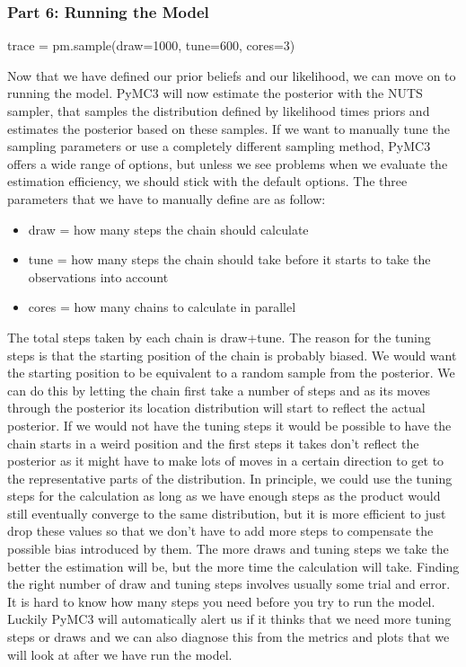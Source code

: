 \documentclass[12pt,a4paper,leqno]{report}
\theoremstyle{plain}
\theoremstyle{definition}
\theoremstyle{remark}
\begin{document}
\subsubsection*{Part 6: Running the Model}

\bigskip
\begin{pyverbatim}[][fontsize=\footnotesize]
    trace = pm.sample(draw=1000, tune=600, cores=3)
\end{pyverbatim}
\smallskip

Now that we have defined our prior beliefs and our likelihood, we can move on to running the
model. PyMC3 will now estimate the posterior with the NUTS sampler,
that samples the distribution defined by likelihood times priors and estimates the
posterior based on these samples. If we want to manually tune the sampling parameters or
use a completely different sampling method, PyMC3 offers a wide range of options, but
unless we see problems when we evaluate the estimation efficiency,
we should stick with the default options. The three parameters that we have to manually define are as follow:

\begin{itemize}
    \item[] draw = how many steps the chain should calculate
    \item[] tune = how many steps the chain should take before it starts to
    take the observations into account
    \item[] cores = how many chains to calculate in parallel
\end{itemize}

The total steps taken by each chain is draw+tune. The reason for the tuning steps is
that the starting position of the chain is probably biased. We would want the starting
position to be equivalent to a random sample from the posterior. We can do this by letting the chain first take
a number of steps and as its moves through the posterior its location distribution will start to
reflect the actual posterior. If we would not have the tuning steps it would be possible
to have the chain starts in a weird position and the first steps it takes don't reflect the
posterior as it might have to make lots of moves in a certain direction to get to the
representative parts of the distribution. In principle, we could use the tuning steps
for the calculation as long as we have enough steps as the product would
still eventually converge to the same distribution, but it is more efficient to just drop these
values so that we don't have to add more steps to compensate the possible bias introduced by
them. The more draws and tuning steps we take the better the estimation will be, but the
more time the calculation will take. Finding the
right number of draw and tuning steps involves usually some trial and error. It is
hard to know how many steps you need before you try to run the model. Luckily PyMC3 will
automatically alert us if it thinks that we need more tuning steps or draws and we can
also diagnose this from the metrics and plots that we will look at after we have run the
model.
\end{document}
